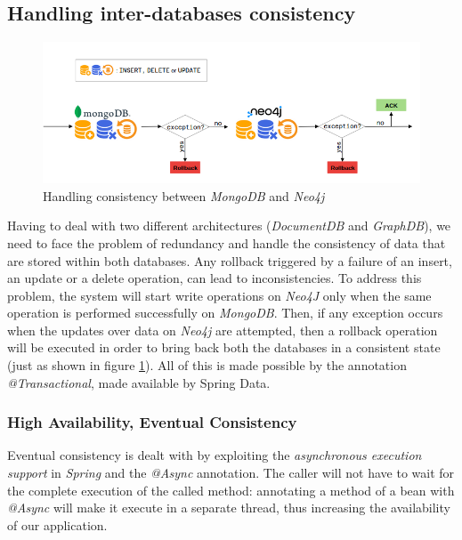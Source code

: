 \subsection{Handling inter-databases consistency}
\begin{figure}[t]
	\centering
	\includegraphics[width=1\textwidth]{chapter3/img/rollback.png}
	\caption{Handling consistency between \emph{MongoDB} and \emph{Neo4j}}
	\label{fig:rb}
\end{figure}
Having to deal with two different architectures (\emph{DocumentDB} and \emph{GraphDB}), we need to face the problem of redundancy and handle the consistency of data that are stored within both databases. 
Any rollback triggered by a failure of an insert, an update or a delete operation, can lead to inconsistencies. 
To address this problem, the system will start write operations on \emph{Neo4J} only when the same operation  is performed successfully on \emph{MongoDB}. Then, if any exception occurs when the updates over data on \emph{Neo4j} are attempted, then a rollback operation will be executed in order to bring back both the databases in a consistent state (just as shown in figure \ref{fig:rb}). All of this is made possible by the annotation \emph{@Transactional}, made available by Spring Data.
 
\subsubsection{High Availability, Eventual Consistency}
Eventual consistency is dealt with by exploiting the \emph{asynchronous execution support} in \emph{Spring} and the \emph{@Async} annotation.
The caller will not have to wait for the complete execution of the called method: annotating a method of a bean with \emph{@Async} will make it execute in a separate thread, thus increasing the availability of our application. 